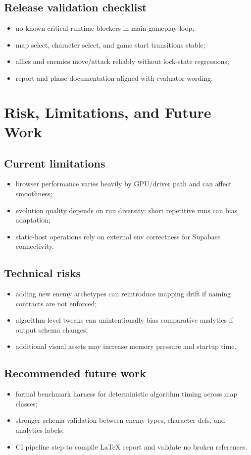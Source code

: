 \documentclass[11pt,a4paper,twoside]{article}
\begin{document}
\subsection{Release validation checklist}
\begin{itemize}[leftmargin=6mm]
  \item no known critical runtime blockers in main gameplay loop;
  \item map select, character select, and game start transitions stable;
  \item allies and enemies move/attack reliably without lock-state regressions;
  \item report and phase documentation aligned with evaluator wording.
\end{itemize}

\section{Risk, Limitations, and Future Work}

\subsection{Current limitations}
\begin{itemize}[leftmargin=6mm]
  \item browser performance varies heavily by GPU/driver path and can affect smoothness;
  \item evolution quality depends on run diversity; short repetitive runs can bias adaptation;
  \item static-host operations rely on external env correctness for Supabase connectivity.
\end{itemize}

\subsection{Technical risks}
\begin{itemize}[leftmargin=6mm]
  \item adding new enemy archetypes can reintroduce mapping drift if naming contracts are not enforced;
  \item algorithm-level tweaks can unintentionally bias comparative analytics if output schema changes;
  \item additional visual assets may increase memory pressure and startup time.
\end{itemize}

\subsection{Recommended future work}
\begin{itemize}[leftmargin=6mm]
  \item formal benchmark harness for deterministic algorithm timing across map classes;
  \item stronger schema validation between enemy types, character defs, and analytics labels;
  \item CI pipeline step to compile LaTeX report and validate no broken references.
\end{itemize}
\end{document}
